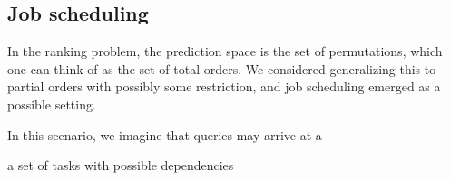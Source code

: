
\subsection{Job scheduling}
In the ranking problem, the prediction space is the set of permutations, which
one can think of as the set of total orders. We considered generalizing
this to partial orders with possibly some restriction, and job scheduling
emerged as a possible setting.

In this scenario, we imagine that queries may arrive at a 

a set of tasks with possible dependencies 

